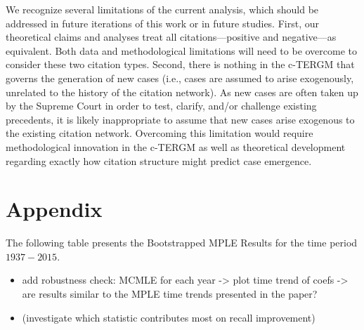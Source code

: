 \documentclass[headsepline=true, abstracton]{scrartcl}
\begin{document}
We recognize several limitations of the current analysis, which should be addressed in future iterations of this work or in future studies. First, our theoretical claims and analyses treat all citations---positive and negative---as equivalent. Both data and methodological limitations will need to be overcome to consider these two citation types. Second, there is nothing in the c-TERGM that governs the generation of new cases (i.e., cases are assumed to arise exogenously, unrelated to the history of the citation network). As new cases are often taken up by the Supreme Court in order to test, clarify, and/or challenge existing precedents, it is likely inappropriate to assume that new cases arise exogenous to the existing citation network. Overcoming this limitation would require methodological innovation in the c-TERGM as well as theoretical development regarding exactly how citation structure might predict case emergence. 


\section{Appendix}
The following table presents the Bootstrapped MPLE Results for the time period $1937-2015$.

\begin{itemize}
\item add robustness check: MCMLE for each year -> plot time trend of coefs -> are results similar to the MPLE time trends presented in the paper?
\item (investigate which statistic contributes most on recall improvement)
\end{itemize}
\end{document}
